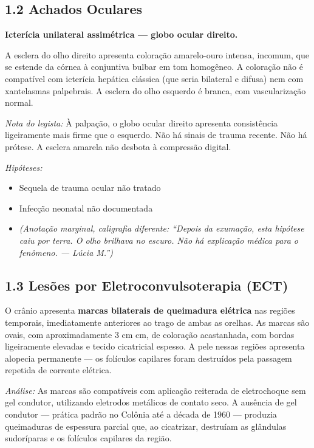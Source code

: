 \subsection*{1.2 Achados Oculares}

\textbf{Icterícia unilateral assimétrica --- globo ocular direito.}

A esclera do olho direito apresenta coloração amarelo-ouro intensa, incomum, que se estende da córnea à conjuntiva bulbar em tom homogêneo. A coloração não é compatível com icterícia hepática clássica (que seria bilateral e difusa) nem com xantelasmas palpebrais. A esclera do olho esquerdo é branca, com vascularização normal.

\textit{Nota do legista:} À palpação, o globo ocular direito apresenta consistência ligeiramente mais firme que o esquerdo. Não há sinais de trauma recente. Não há prótese. A esclera amarela não desbota à compressão digital.

\textit{Hipóteses:}
\begin{itemize}
    \item Sequela de trauma ocular não tratado
    \item Infecção neonatal não documentada
    \item \textit{(Anotação marginal, caligrafia diferente: ``Depois da exumação, esta hipótese caiu por terra. O olho brilhava no escuro. Não há explicação médica para o fenômeno. --- Lúcia M.'')}
\end{itemize}

\subsection*{1.3 Lesões por Eletroconvulsoterapia (ECT)}

O crânio apresenta \textbf{marcas bilaterais de queimadura elétrica} nas regiões temporais, imediatamente anteriores ao trago de ambas as orelhas. As marcas são ovais, com aproximadamente 3 cm  cm, de coloração acastanhada, com bordas ligeiramente elevadas e tecido cicatricial espesso. A pele nessas regiões apresenta alopecia permanente --- os folículos capilares foram destruídos pela passagem repetida de corrente elétrica.

\textit{Análise:} As marcas são compatíveis com aplicação reiterada de eletrochoque sem gel condutor, utilizando eletrodos metálicos de contato seco. A ausência de gel condutor --- prática padrão no Colônia até a década de 1960 --- produzia queimaduras de espessura parcial que, ao cicatrizar, destruíam as glândulas sudoríparas e os folículos capilares da região.

